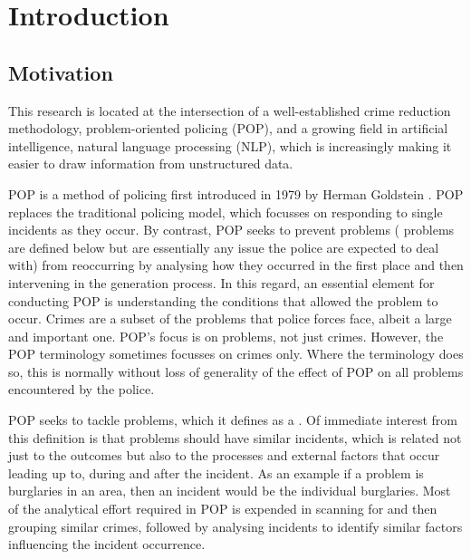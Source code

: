 \chapter{Introduction}

\section{Motivation}
This research is located at the intersection of a well-established crime reduction methodology, problem-oriented policing (POP), and a growing field in artificial intelligence, natural language processing (NLP), which is increasingly making it easier to draw information from unstructured data.

POP is a method of policing first introduced in 1979 by Herman Goldstein \parencite{gold79} . POP replaces the traditional policing model, which focusses on responding to single incidents as they occur. By contrast, POP seeks to prevent problems ( problems are defined below but are essentially any issue the police are expected to deal with) from reoccurring by analysing how they occurred in the first place and then intervening in the generation process. In this regard, an essential element for conducting POP is understanding the conditions that allowed the problem to occur. Crimes are a subset of the problems that police forces face, albeit a large and important one. POP’s focus is on problems, not just crimes. However, the POP terminology sometimes focusses on crimes only. Where the terminology does so, this is normally without loss of generality of the effect of POP on all problems encountered by the police.

POP seeks to tackle problems, which it defines as a  \parencite{popchap11}. Of immediate interest from this definition is that problems should have similar incidents, which is related not just to the outcomes but also to the processes and external factors that occur leading up to, during and after the incident.  As an example if a problem is burglaries in an area, then an incident would be the individual burglaries. Most of the analytical effort required in POP is expended in scanning for and then grouping similar crimes, followed by analysing incidents to identify similar factors influencing the incident occurrence.

